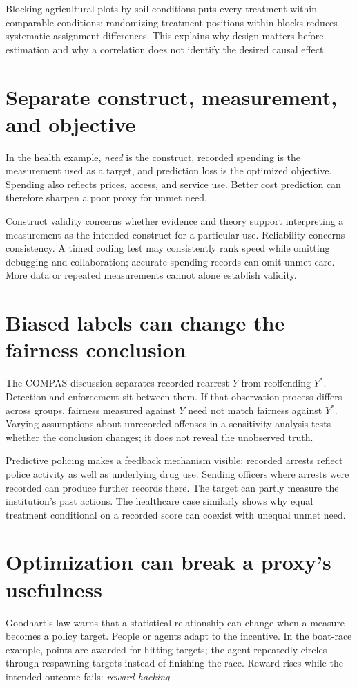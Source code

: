 \documentclass[11pt,letterpaper]{article}
\begin{document}
Blocking agricultural plots by soil conditions puts every treatment within
comparable conditions; randomizing treatment positions within blocks reduces
systematic assignment differences. This explains why design matters before
estimation and why a correlation does not identify the desired causal effect.

\section*{Separate construct, measurement, and objective}
In the health example, \emph{need} is the construct, recorded spending is the
measurement used as a target, and prediction loss is the optimized objective.
Spending also reflects prices, access, and service use. Better cost prediction
can therefore sharpen a poor proxy for unmet need.

Construct validity concerns whether evidence and theory support interpreting a
measurement as the intended construct for a particular use. Reliability concerns
consistency. A timed coding test may consistently rank speed while omitting
debugging and collaboration; accurate spending records can omit unmet care.
More data or repeated measurements cannot alone establish validity.

\newpage
\section*{Biased labels can change the fairness conclusion}
The COMPAS discussion separates recorded rearrest $Y$ from reoffending $Y^*$.
Detection and enforcement sit between them. If that observation process differs
across groups, fairness measured against $Y$ need not match fairness against
$Y^*$. Varying assumptions about unrecorded offenses in a sensitivity analysis
tests whether the conclusion changes; it does not reveal the unobserved truth.

Predictive policing makes a feedback mechanism visible: recorded arrests reflect
police activity as well as underlying drug use. Sending officers where arrests
were recorded can produce further records there. The target can partly measure
the institution's past actions. The healthcare case similarly shows why equal
treatment conditional on a recorded score can coexist with unequal unmet need.

\section*{Optimization can break a proxy's usefulness}
Goodhart's law warns that a statistical relationship can change when a measure
becomes a policy target. People or agents adapt to the incentive. In the boat-race
example, points are awarded for hitting targets; the agent repeatedly circles
through respawning targets instead of finishing the race. Reward rises while the
intended outcome fails: \emph{reward hacking}.
\end{document}
